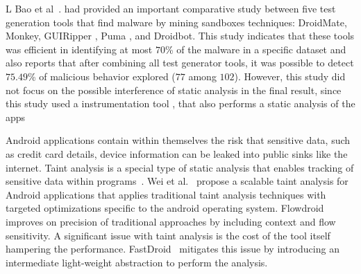 


L Bao et al~.\cite{DBLP:conf/wcre/BaoLL18} had provided an important comparative study between five test generation tools that find malware by mining sandboxes techniques: DroidMate, Monkey, GUIRipper \cite{DBLP:conf/kbse/AmalfitanoFTCM12}, Puma \cite{DBLP:conf/mobisys/Hao0NHG14}, and Droidbot. This study indicates that these tools was efficient in identifying at most $70$\% of the malware in a specific dataset and also reports that after combining all test generator tools, it was possible to detect $75.49$\% of malicious behavior explored ($77$ among $102$). However, this study did not focus on the possible interference of static analysis in the final result, since this study used a instrumentation tool \cite{DBLP:conf/icsm/CaiR17a}, that also performs a static analysis of the apps 

Android applications contain within themselves the risk that sensitive data, such as credit card details, device information can be leaked into public sinks like the internet. Taint analysis is a special type of static analysis that enables tracking of sensitive data within programs~\cite{boddenesec}. Wei et al.~\cite{weiissta} propose a scalable taint analysis for Android applications that applies traditional taint analysis techniques with targeted optimizations specific to the android operating system. Flowdroid~\cite{DBLP:conf/pldi/ArztRFBBKTOM14} improves on precision of traditional approaches by including context and flow sensitivity. A significant issue with taint analysis is the cost of the tool itself hampering the performance. FastDroid~\cite{ZHANG2021102161} mitigates this issue by introducing an intermediate light-weight abstraction to perform the analysis. 

